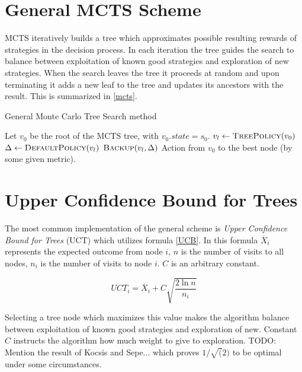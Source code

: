 \section{General MCTS Scheme}

MCTS iteratively builds a tree which approximates possible resulting
rewards of strategies in the decision process. In each iteration the
tree guides the search to balance between exploitation of known good
strategies and exploration of new strategies. When the search leaves the
tree it proceeds at random and upon terminating it adds a new leaf to
the tree and updates its ancestors with the result. This is summarized
in \autoref{mcts}.


\begin{algorithm}
\caption{General Monte Carlo Tree Search method}
\label{mcts}
\begin{algorithmic}
    \State Let $v_0$ be the root of the MCTS tree, with $v_0.state = s_0$.
        \State $v_l \gets \Call{TreePolicy}{v_0}$
        \State $\Delta \gets \Call{DefaultPolicy}{v_l}$
        \State $\Call{Backup}{v_l, \Delta}$
    \EndWhile
    \State \Return Action from $v_0$ to the best node (by some
    given metric).
\EndFunction
\end{algorithmic}
\end{algorithm}

\section{Upper Confidence Bound for Trees}

The most common implementation of the general scheme is {\em Upper
Confidence Bound for Trees} (UCT) which utilizes formula \ref{UCB}.
In this formula $\overline{X}_i$ represents the expected outcome
from node $i$, $n$ is the number of visits to all nodes, $n_i$ is the
number of visits to node $i$. $C$ is an arbitrary constant.

\begin{equation}
\label{UCB}
UCT_i = \overline{X}_i + C \sqrt{ \frac{2 \ln n}{n_i} }
\end{equation}

Selecting a tree node which maximizes this value makes the algorithm balance
between exploitation of known good strategies and exploration of new.
Constant $C$ instructs the algorithm how much weight to give to
exploration. TODO: Mention the result of Kocsis and Sepe... which proves
$1/\sqrt(2)$ to be optimal under some circumstances.

